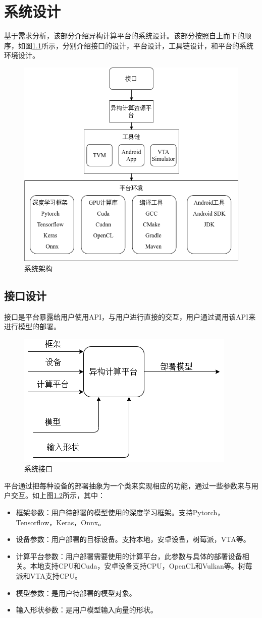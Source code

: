 \chapter{系统设计}

基于需求分析，该部分介绍异构计算平台的系统设计。该部分按照自上而下的顺序，如图\ref{platform_arch}所示，分别介绍接口的设计，平台设计，工具链设计，和平台的系统环境设计。

\begin{figure}[h!]
    \centering
    \includegraphics[width=180bp]{figure/platform_arch.png}
    \caption{系统架构}
    \label{platform_arch}
\end{figure}


\section{接口设计}

接口是平台暴露给用户使用API，与用户进行直接的交互，用户通过调用该API来进行模型的部署。

\begin{figure}[h!]
    \centering
    \includegraphics[width=180bp]{figure/platform_interface.png}
    \caption{系统接口}
    \label{platform_interface}
\end{figure}

平台通过把每种设备的部署抽象为一个类来实现相应的功能，通过一些参数来与用户交互。如上图\ref{platform_interface}所示，其中：
\begin{itemize}
    \item {框架参数：用户待部署的模型使用的深度学习框架。支持Pytorch，Tensorflow，Keras，Onnx。}
    \item {设备参数：用户部署的目标设备。支持本地，安卓设备，树莓派，VTA等。}
    \item {计算平台参数：用户部署需要使用的计算平台，此参数与具体的部署设备相关。本地支持CPU和Cuda，安卓设备支持CPU，OpenCL和Vulkan等。树莓派和VTA支持CPU。}
    \item {模型参数：是用户待部署的模型对象。}
    \item {输入形状参数：是用户模型输入向量的形状。}
\end{itemize}

